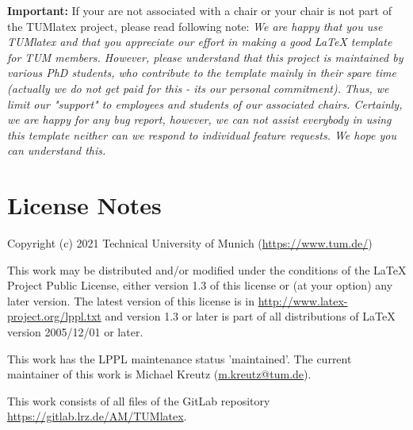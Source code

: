 \textbf{Important:} If your are not associated with a chair or your chair is not part of the TUMlatex project, please read following note:
\textit{
    We are happy that you use TUMlatex and that you appreciate our effort in making a good LaTeX template for TUM members.
    However, please understand that this project is maintained by various PhD students, who contribute to the template mainly in their spare time (actually we do not get paid for this - its our personal commitment).
    Thus, we limit our "support" to employees and students of our associated chairs.
    Certainly, we are happy for any bug report, however, we can not assist everybody in using this template neither can we respond to individual feature requests.
    We hope you can understand this.
}

\section {License Notes}

Copyright (c) 2021 Technical University of Munich (\url{https://www.tum.de/})

This work may be distributed and/or modified under the conditions of the LaTeX Project Public License, either version 1.3 of this license or (at your option) any later version.
The latest version of this license is in \url{http://www.latex-project.org/lppl.txt} and version 1.3 or later is part of all distributions of LaTeX version 2005/12/01 or later.

This work has the LPPL maintenance status 'maintained'.
The current maintainer of this work is Michael Kreutz (\href{mailto:m.kreutz@tum.de}{m.kreutz@tum.de}).

This work consists of all files of the GitLab repository \url{https://gitlab.lrz.de/AM/TUMlatex}.
%
